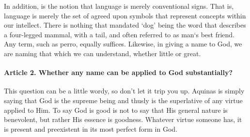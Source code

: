 \documentclass{ucetd}
\begin{document}
In addition, is the notion that language is merely conventional signs. That is, language is merely the set of agreed upon symbols that represent concepts within our intellect. There is nothing that mandated `dog' being the word that describes a four-legged mammal, with a tail, and often referred to as man`s best friend. Any term, such as perro, equally suffices. Likewise, in giving a name to God, we are naming that which we can understand, whether little or great.

\paragraph{Article 2. Whether any name can be applied to God substantially?}
This question can be a little wordy, so don't let it trip you up. Aquinas is simply saying that God is the supreme being and thusly is the superlative of any virtue applied to Him. To say God is good is not to say that His general nature is benevolent, but rather His essence is goodness. Whatever virtue someone has, it is present and preexistent in its most perfect form in God.
\end{document}
